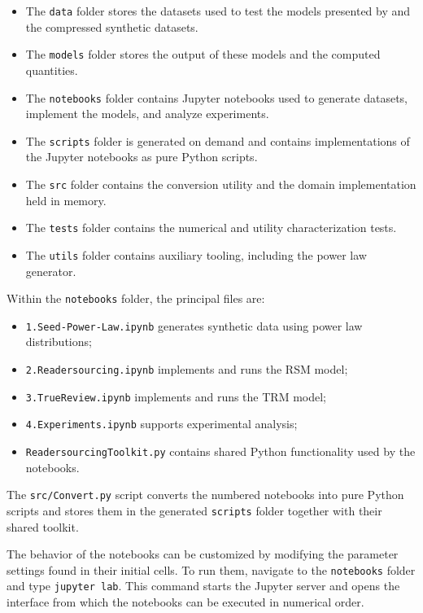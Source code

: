 \documentclass[a4paper, english]{article}
\begin{document}
\begin{itemize}
    \item The \verb|data| folder stores the datasets used to test the models presented by \citet{Soprano2019} and the compressed synthetic datasets.
    \item The \verb|models| folder stores the output of these models and the computed quantities.
    \item The \verb|notebooks| folder contains Jupyter notebooks used to generate datasets, implement the models, and analyze experiments.
    \item The \verb|scripts| folder is generated on demand and contains implementations of the Jupyter notebooks as pure Python scripts.
    \item The \verb|src| folder contains the conversion utility and the domain implementation held in memory.
    \item The \verb|tests| folder contains the numerical and utility characterization tests.
    \item The \verb|utils| folder contains auxiliary tooling, including the power law generator.
\end{itemize}

Within the \verb|notebooks| folder, the principal files are:

\begin{itemize}
    \item \verb|1.Seed-Power-Law.ipynb| generates synthetic data using power law distributions;
    \item \verb|2.Readersourcing.ipynb| implements and runs the RSM model;
    \item \verb|3.TrueReview.ipynb| implements and runs the TRM model;
    \item \verb|4.Experiments.ipynb| supports experimental analysis;
    \item \verb|ReadersourcingToolkit.py| contains shared Python functionality used by the notebooks.
\end{itemize}

The \verb|src/Convert.py| script converts the numbered notebooks into pure Python scripts and stores them in the generated \verb|scripts| folder together with their shared toolkit.

The behavior of the notebooks can be customized by modifying the parameter settings found in their initial cells. To run them, navigate to the \verb|notebooks| folder and type \verb|jupyter lab|. This command starts the Jupyter server and opens the interface from which the notebooks can be executed in numerical order.
\end{document}
